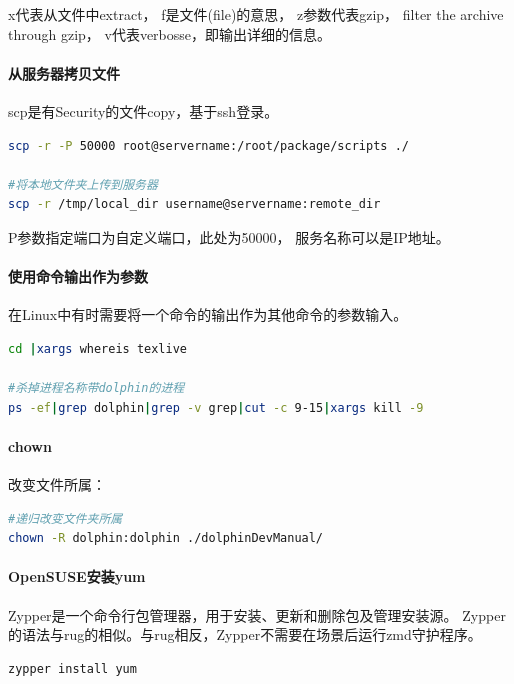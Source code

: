 \documentclass{book}
\begin{document}
x代表从文件中extract，
f是文件(file)的意思，
z参数代表gzip，
filter the archive through gzip，
v代表verbosse，即输出详细的信息。

\paragraph{从服务器拷贝文件}

scp是有Security的文件copy，基于ssh登录。 

\begin{lstlisting}[language=Bash]
scp -r -P 50000 root@servername:/root/package/scripts ./

#将本地文件夹上传到服务器
scp -r /tmp/local_dir username@servername:remote_dir
\end{lstlisting}

P参数指定端口为自定义端口，此处为50000，
服务名称可以是IP地址。

\paragraph{使用命令输出作为参数}

在Linux中有时需要将一个命令的输出作为其他命令的参数输入。

\begin{lstlisting}[language=Bash]
cd |xargs whereis texlive

#杀掉进程名称带dolphin的进程
ps -ef|grep dolphin|grep -v grep|cut -c 9-15|xargs kill -9
\end{lstlisting}

\paragraph{chown}

改变文件所属：

\begin{lstlisting}[language=Bash]
#递归改变文件夹所属
chown -R dolphin:dolphin ./dolphinDevManual/
\end{lstlisting}

\paragraph{OpenSUSE安装yum}

Zypper是一个命令行包管理器，用于安装、更新和删除包及管理安装源。
Zypper的语法与rug的相似。与rug相反，Zypper不需要在场景后运行zmd守护程序。

\begin{lstlisting}[language=Bash]
zypper install yum
\end{lstlisting}
\end{document}
